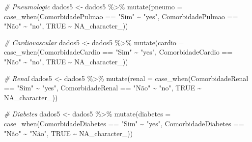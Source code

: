\documentclass[
]{article}
\newenvironment{Shaded}{\begin{snugshade}}{\end{snugshade}}
\newcommand{\AttributeTok}[1]{\textcolor[rgb]{0.77,0.63,0.00}{#1}}
\newcommand{\CommentTok}[1]{\textcolor[rgb]{0.56,0.35,0.01}{\textit{#1}}}
\newcommand{\ConstantTok}[1]{\textcolor[rgb]{0.00,0.00,0.00}{#1}}
\newcommand{\FunctionTok}[1]{\textcolor[rgb]{0.00,0.00,0.00}{#1}}
\newcommand{\NormalTok}[1]{#1}
\newcommand{\OtherTok}[1]{\textcolor[rgb]{0.56,0.35,0.01}{#1}}
\newcommand{\SpecialCharTok}[1]{\textcolor[rgb]{0.00,0.00,0.00}{#1}}
\newcommand{\StringTok}[1]{\textcolor[rgb]{0.31,0.60,0.02}{#1}}
\begin{document}
\begin{Shaded}
\begin{Highlighting}[]
\CommentTok{\# Pneumologic}
\NormalTok{dados5 }\OtherTok{\textless{}{-}}\NormalTok{  dados5 }\SpecialCharTok{\%\textgreater{}\%}
  \FunctionTok{mutate}\NormalTok{(}\AttributeTok{pneumo =} \FunctionTok{case\_when}\NormalTok{(ComorbidadePulmao }\SpecialCharTok{==} \StringTok{"Sim"} \SpecialCharTok{\textasciitilde{}} \StringTok{"yes"}\NormalTok{,}
\NormalTok{                              ComorbidadePulmao }\SpecialCharTok{==} \StringTok{"Não"} \SpecialCharTok{\textasciitilde{}} \StringTok{"no"}\NormalTok{,}
                              \ConstantTok{TRUE} \SpecialCharTok{\textasciitilde{}} \ConstantTok{NA\_character\_}\NormalTok{))}

\CommentTok{\# Cardiovascular}
\NormalTok{dados5 }\OtherTok{\textless{}{-}}\NormalTok{  dados5 }\SpecialCharTok{\%\textgreater{}\%}
  \FunctionTok{mutate}\NormalTok{(}\AttributeTok{cardio =} \FunctionTok{case\_when}\NormalTok{(ComorbidadeCardio }\SpecialCharTok{==} \StringTok{"Sim"} \SpecialCharTok{\textasciitilde{}} \StringTok{"yes"}\NormalTok{,}
\NormalTok{                              ComorbidadeCardio }\SpecialCharTok{==} \StringTok{"Não"} \SpecialCharTok{\textasciitilde{}} \StringTok{"no"}\NormalTok{,}
                              \ConstantTok{TRUE} \SpecialCharTok{\textasciitilde{}} \ConstantTok{NA\_character\_}\NormalTok{))}

\CommentTok{\# Renal}
\NormalTok{dados5 }\OtherTok{\textless{}{-}}\NormalTok{  dados5 }\SpecialCharTok{\%\textgreater{}\%}
  \FunctionTok{mutate}\NormalTok{(}\AttributeTok{renal =} \FunctionTok{case\_when}\NormalTok{(ComorbidadeRenal }\SpecialCharTok{==} \StringTok{"Sim"} \SpecialCharTok{\textasciitilde{}} \StringTok{"yes"}\NormalTok{,}
\NormalTok{                              ComorbidadeRenal }\SpecialCharTok{==} \StringTok{"Não"} \SpecialCharTok{\textasciitilde{}} \StringTok{"no"}\NormalTok{,}
                              \ConstantTok{TRUE} \SpecialCharTok{\textasciitilde{}} \ConstantTok{NA\_character\_}\NormalTok{))}

\CommentTok{\# Diabetes}
\NormalTok{dados5 }\OtherTok{\textless{}{-}}\NormalTok{  dados5 }\SpecialCharTok{\%\textgreater{}\%}
  \FunctionTok{mutate}\NormalTok{(}\AttributeTok{diabetes =} \FunctionTok{case\_when}\NormalTok{(ComorbidadeDiabetes }\SpecialCharTok{==} \StringTok{"Sim"} \SpecialCharTok{\textasciitilde{}} \StringTok{"yes"}\NormalTok{,}
\NormalTok{                              ComorbidadeDiabetes }\SpecialCharTok{==} \StringTok{"Não"} \SpecialCharTok{\textasciitilde{}} \StringTok{"Não"}\NormalTok{,}
                              \ConstantTok{TRUE} \SpecialCharTok{\textasciitilde{}} \ConstantTok{NA\_character\_}\NormalTok{))}


\end{Highlighting}
\end{Shaded}
\end{document}
